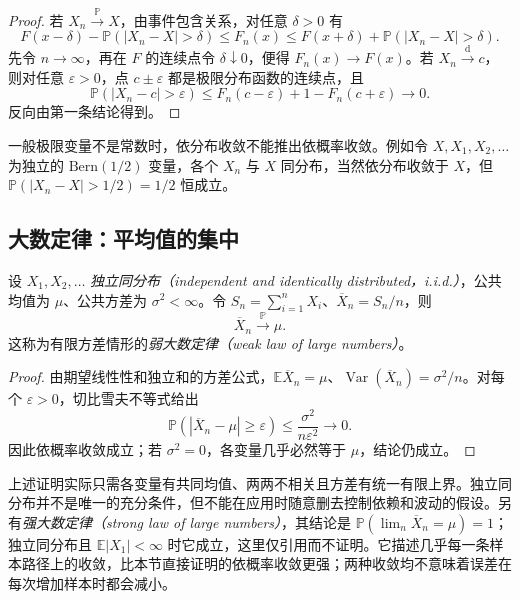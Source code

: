 \begin{proof}
若 $X_n\xrightarrow{\mathbb P}X$，由事件包含关系，对任意 $\delta>0$ 有
\[
  F(x-\delta)-\mathbb P(|X_n-X|>\delta)
    \le F_n(x)
    \le F(x+\delta)+\mathbb P(|X_n-X|>\delta).
\]
先令 $n\to\infty$，再在 $F$ 的连续点令 $\delta\downarrow0$，便得 $F_n(x)\to F(x)$。若 $X_n\xrightarrow{\mathrm d}c$，则对任意 $\varepsilon>0$，点 $c\pm\varepsilon$ 都是极限分布函数的连续点，且
\[
  \mathbb P(|X_n-c|>\varepsilon)
    \le F_n(c-\varepsilon)+1-F_n(c+\varepsilon)\longrightarrow0.
\]
反向由第一条结论得到。
\end{proof}

一般极限变量不是常数时，依分布收敛不能推出依概率收敛。例如令 $X,X_1,X_2,\ldots$ 为独立的 $\mathrm{Bern}(1/2)$ 变量，各个 $X_n$ 与 $X$ 同分布，当然依分布收敛于 $X$，但 $\mathbb P(|X_n-X|>1/2)=1/2$ 恒成立。

\subsection{大数定律：平均值的集中}
\label{subsec:study-law-large-numbers}

\begin{theorem}
\label{thm:study-weak-law}
设 $X_1,X_2,\ldots$ \emph{独立同分布（independent and identically distributed，i.i.d.）}，公共均值为 $\mu$、公共方差为 $\sigma^2<\infty$。令 $S_n=\sum_{i=1}^nX_i$、$\overline X_n=S_n/n$，则
\begin{equation}
  \overline X_n\xrightarrow{\mathbb P}\mu.
  \label{eq:study-weak-law}
\end{equation}
这称为有限方差情形的\emph{弱大数定律（weak law of large numbers）}。
\end{theorem}

\begin{proof}
由期望线性性和独立和的方差公式，$\mathbb E\overline X_n=\mu$、$\operatorname{Var}(\overline X_n)=\sigma^2/n$。对每个 $\varepsilon>0$，切比雪夫不等式给出
\begin{equation}
  \mathbb P(|\overline X_n-\mu|\ge\varepsilon)
    \le\frac{\sigma^2}{n\varepsilon^2}\longrightarrow0.
  \label{eq:study-weak-law-bound}
\end{equation}
因此依概率收敛成立；若 $\sigma^2=0$，各变量几乎必然等于 $\mu$，结论仍成立。
\end{proof}

上述证明实际只需各变量有共同均值、两两不相关且方差有统一有限上界。独立同分布并不是唯一的充分条件，但不能在应用时随意删去控制依赖和波动的假设。另有\emph{强大数定律（strong law of large numbers）}，其结论是 $\mathbb P(\lim_n\overline X_n=\mu)=1$；独立同分布且 $\mathbb E|X_1|<\infty$ 时它成立，这里仅引用而不证明。它描述几乎每一条样本路径上的收敛，比本节直接证明的依概率收敛更强；两种收敛均不意味着误差在每次增加样本时都会减小。

